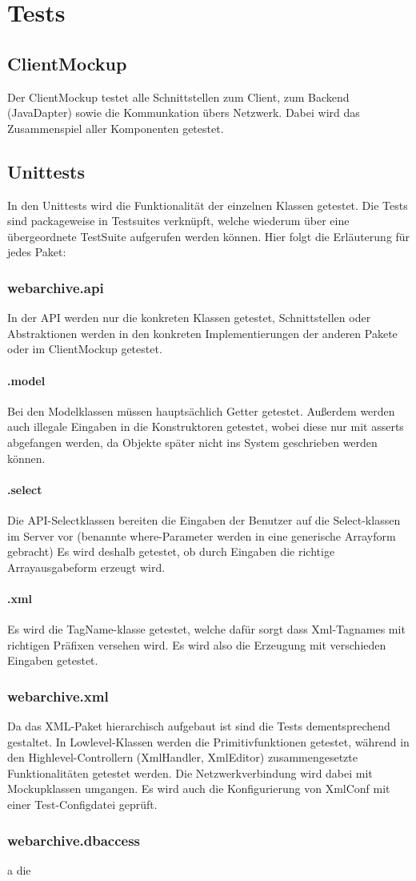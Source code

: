 \chapter{Tests}
\section{ClientMockup}
	Der ClientMockup testet alle Schnittstellen zum Client, zum Backend (JavaDapter) sowie die Kommunkation übers Netzwerk.
	Dabei wird das Zusammenspiel aller Komponenten getestet.
\section{Unittests}
	In den Unittests wird die Funktionalität der einzelnen Klassen getestet.
	Die Tests sind packageweise in Testsuites verknüpft, welche wiederum über eine übergeordnete TestSuite aufgerufen werden können.
	Hier folgt die Erläuterung für jedes Paket:	
	\subsection{webarchive.api}
		In der API werden nur die konkreten Klassen getestet, Schnittstellen
		oder Abstraktionen werden in den konkreten Implementierungen der anderen Pakete oder im ClientMockup getestet.
		\subsubsection{.model}
		Bei den Modelklassen müssen hauptsächlich Getter getestet.
		Außerdem werden auch illegale Eingaben in die Konstruktoren getestet,
		wobei diese nur mit asserts abgefangen werden, da Objekte später nicht
		ins System geschrieben werden können.
		\subsubsection{.select}
		Die API-Selectklassen bereiten die Eingaben der Benutzer auf die
		Select-klassen im Server vor (benannte where-Parameter werden in
		eine generische Arrayform gebracht)
		Es wird deshalb getestet, ob durch Eingaben die richtige Arrayausgabeform erzeugt wird.  
		\subsubsection{.xml}
		Es wird die TagName-klasse getestet, welche dafür sorgt dass Xml-Tagnames mit richtigen Präfixen versehen wird. Es wird also die Erzeugung mit verschieden Eingaben getestet.
	\subsection{webarchive.xml}
		Da das XML-Paket hierarchisch aufgebaut ist sind die Tests dementsprechend gestaltet. 
In Lowlevel-Klassen werden die Primitivfunktionen getestet, während in den Highlevel-Controllern (XmlHandler, XmlEditor) zusammengesetzte Funktionalitäten getestet werden. 
	Die Netzwerkverbindung wird dabei mit Mockupklassen umgangen. 
	Es wird auch die Konfigurierung von XmlConf mit einer Test-Configdatei geprüft.

	\subsection{webarchive.dbaccess}
		a die  
